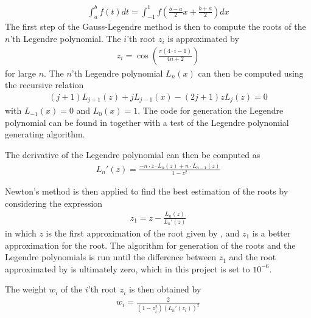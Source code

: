 \begin{align}
	\int _a ^b f(t) dt = \int _{-1} ^1 f \left( \frac{b-a}{2} x + \frac{b+a}{2} \right) dx
	\label{eq:GLdMethod2}
\end{align} 
The first step of the Gauss-Legendre method is then to compute the roots of the $n$'th Legendre polynomial.
The $i$'th root $z_i$ is approximated by
\begin{align}
	z_i = \cos \left( \frac{\pi (4\cdot i - 1)}{4n+2} \right)
	\label{eq:GLdMethod3}
\end{align} 
for large $n$.
The $n$'th Legendre polynomial $L_n(x)$ can then be computed using the recursive relation
\begin{align}
	(j+1)L_{j+1} (z) + j L_{j-1} (x) -(2j+1) z L_j (z) = 0
	\label{eq:GLdMethod4}
\end{align} 
with $L_{-1} (x) = 0$ and $L_0 (x) = 1$.
The code for generation the Legendre polynomial can be found in  together with a test of the Legendre polynomial generating algorithm.

The derivative of the Legendre polynomial can then be computed as
\begin{align}
	L_n '(z) = \frac{-n\cdot z \cdot L_n (z) +n \cdot L_{n-1} (z)}{1-z^2} 
	\label{eq:GLdMethod4a}
\end{align}

Newton's method is then applied to find the best estimation of the roots by considering the expression
\begin{align}
	z_1 = z- \frac{L_n(z)}{L_n'(z)}
	\label{eq:GLdMethod5}
\end{align}
in which $z$ is the first approximation of the root given by , and $z_1$ is a better approximation for the root. 
The algorithm for generation of the roots and the Legendre polynomials is run until the difference between $z_1$ and the root approximated by  is ultimately zero, which in this project is set to $10^{-6}$.

The weight $w_i$ of the $i$'th root $z_i$ is then obtained by
\begin{align}
	w_i = \frac{2}{(1-z_i^2)(L_n'(z_i))^2}
	\label{eq:GLdMethod6}
\end{align}
  

